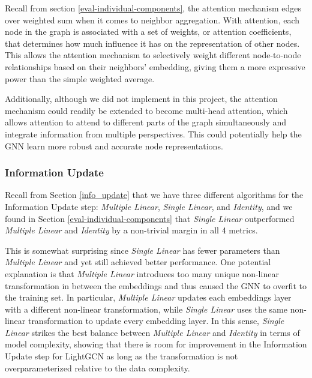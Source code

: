 \documentclass{article}
\begin{document}
Recall from section \ref{eval-individual-components}, the attention mechanism edges over weighted sum when it comes to neighbor aggregation. With attention, each node in the graph is associated with a set of weights, or attention coefficients, that determines how much influence it has on the representation of other nodes. This allows the attention mechanism to selectively weight different node-to-node relationships based on their neighbors' embedding, giving them a more expressive power than the simple weighted average.

Additionally, although we did not implement in this project, the attention mechanism could readily be extended to become multi-head attention, which allows attention to attend to different parts of the graph simultaneously and integrate information from multiple perspectives. This could potentially help the GNN learn more robust and accurate node representations.

\subsubsection{Information Update}

Recall from Section \ref{info_update} that we have three different algorithms for the Information Update step: \textit{Multiple Linear}, \textit{Single Linear}, and \textit{Identity}, and we found in Section \ref{eval-individual-components} that \textit{Single Linear} outperformed \textit{Multiple Linear} and \textit{Identity} by a non-trivial margin in all 4 metrics.


This is somewhat surprising since \textit{Single Linear} has fewer parameters than \textit{Multiple Linear} and yet still achieved better performance. One potential explanation is that \textit{Multiple Linear} introduces too many unique non-linear transformation in between the embeddings and thus caused the GNN to overfit to the training set. In particular, \textit{Multiple Linear} updates each embeddings layer with a different non-linear transformation, while \textit{Single Linear} uses the same non-linear transformation to update every embedding layer. In this sense, \textit{Single Linear} strikes the best balance between \textit{Multiple Linear} and \textit{Identity} in terms of model complexity, showing that there is room for improvement in the Information Update step for LightGCN as long as the transformation is not overparameterized relative to the data complexity.
\end{document}
